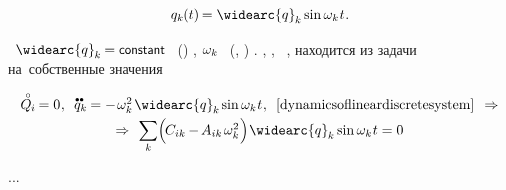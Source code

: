 \begin{otherlanguage}{russian}
\nopagebreak\vspace{-0.25em}\begin{equation*}
q_k \hspace{-0.1ex} (t) \hspace{-0.2ex} = \widearc{q}_{\hspace{-0.1ex}k} \operatorname{sin} \omega_k \hspace{.1ex} t
\hspace{.1ex} .
\end{equation*}

\vspace{-0.2em} \noindent
{}~${\widearc{q}_{\hspace{-0.1ex}k} \hspace{-0.15ex} = \constant}$\ru{\:---} ~()  , ${\omega_k\hspace{-0.1ex}}$\ru{\:---} ~(, ) .
,   ,  ~, находится из задачи на~собственные значения

\nopagebreak\vspace{-0.1em}\begin{equation}
\begin{array}{c}
\mathcircabove{Q}_{\hspace{-0.1ex}i} \hspace{-0.15ex} = 0
\hspace{.1ex} ,
\:\;
\mathdotdotabove{q}_k \hspace{-0.12ex} = - \hspace{.2ex} \omega_k^2 \hspace{.25ex} \widearc{q}_{\hspace{-0.1ex}k} \hspace{-0.1ex} \operatorname{sin} \omega_k \hspace{.1ex} t
\hspace{.1ex} ,
\:\;
\eqref{dynamicsoflineardiscretesystem}
\:\: \Rightarrow
\\[.3em]
%
\Rightarrow \:\,
\scalebox{0.95}[1]{$\displaystyle \sum_{\smash{k}}$} \Bigl( \hspace{-0.2ex} C_{ik} \hspace{-0.1ex} - \hspace{-0.2ex} A_{ik} \hspace{.25ex} \omega_k^2 \hspace{.1ex} \Bigr) \hspace{.12ex}
\widearc{q}_{\hspace{-0.1ex}k} \operatorname{sin} \omega_k \hspace{.1ex} t
= 0
\end{array}
\end{equation}

...


\end{otherlanguage}

